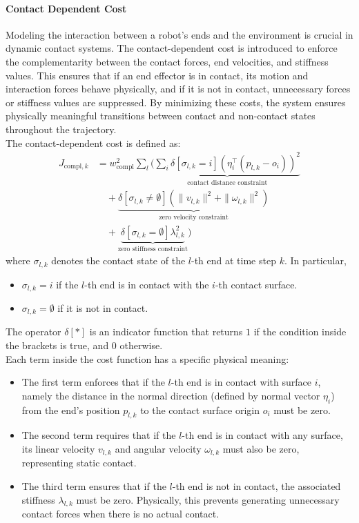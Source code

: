 \documentclass[main.tex]{subfiles}
\begin{document}
\paragraph{Contact Dependent Cost}
Modeling the interaction between a robot's ends and the environment is crucial in dynamic contact systems. The contact-dependent cost is introduced to enforce the complementarity between the contact forces, end velocities, and stiffness values. This ensures that if an end effector is in contact, its motion and interaction forces behave physically, and if it is not in contact, unnecessary forces or stiffness values are suppressed.
By minimizing these costs, the system ensures physically meaningful transitions between contact and non-contact states throughout the trajectory.
\\
The contact-dependent cost is defined as:
\begin{equation}
\begin{aligned}
    J_{\text{compl},k} 
    &= w_{\text{compl}}^2 \sum_l \Bigg(
    \underbrace{ \sum_i \delta\left[\sigma_{l,k} = i\right] \left( \eta_i^\top (p_{l,k} - o_i) \right)^2 }_{\text{contact distance constraint}} \\
    &\quad + \underbrace{ \delta\left[\sigma_{l,k} \neq \emptyset\right] \left( \| v_{l,k} \|^2 + \| \omega_{l,k} \|^2 \right) }_{\text{zero velocity constraint}} \\
    &\quad + \underbrace{ \delta\left[\sigma_{l,k} = \emptyset\right] \lambda_{l,k}^2 }_{\text{zero stiffness constraint}}
    \Bigg)
\end{aligned}
\end{equation}
where $\sigma_{l,k}$ denotes the contact state of the $l$-th end at time step $k$. In particular, 
\begin{itemize}
    \item $\sigma_{l,k} = i$ if the $l$-th end is in contact with the $i$-th contact surface.
    \item $\sigma_{l,k} = \emptyset$ if it is not in contact.
\end{itemize}
The operator $\delta[\ast]$ is an indicator function that returns $1$ if the condition inside the brackets is true, and $0$ otherwise.
\\
Each term inside the cost function has a specific physical meaning:
\begin{itemize}
    \item The first term enforces that if the $l$-th end is in contact with surface $i$, namely the distance in the normal direction (defined by normal vector $\eta_i$) from the end's position $p_{l,k}$ to the contact surface origin $o_i$ must be zero.
    \item The second term requires that if the $l$-th end is in contact with any surface, its linear velocity $v_{l,k}$ and angular velocity $\omega_{l,k}$ must also be zero, representing static contact.
    \item The third term ensures that if the $l$-th end is not in contact, the associated stiffness $\lambda_{l,k}$ must be zero. Physically, this prevents generating unnecessary contact forces when there is no actual contact.
\end{itemize}
\end{document}
